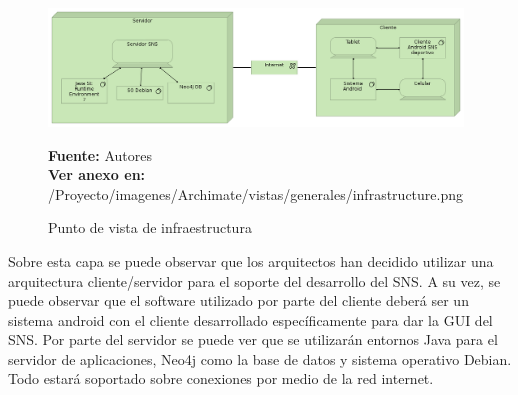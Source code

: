 \begin{figure}[!htb]
  \begin{center}
    \includegraphics[width=11cm]{./imagenes/Archimate/vistas/generales/infrastructure.png}
    \caption{Punto de vista de infraestructura}
    \label{fig:infrastructure}
    \textbf{Fuente:}  Autores \\
    \textbf{Ver anexo en:} /Proyecto/imagenes/Archimate/vistas/generales/infrastructure.png
  \end{center}
\end{figure}

Sobre esta capa se puede observar que los arquitectos han decidido utilizar una arquitectura cliente/servidor para el soporte del desarrollo del SNS. A su vez, se puede observar que el software utilizado por parte del cliente deberá ser un sistema android con el cliente desarrollado específicamente para dar la GUI del SNS. Por parte del servidor se puede ver que se utilizarán entornos Java para el servidor de aplicaciones, Neo4j como la base de datos y sistema operativo Debian. Todo estará soportado sobre conexiones por medio de la red internet.